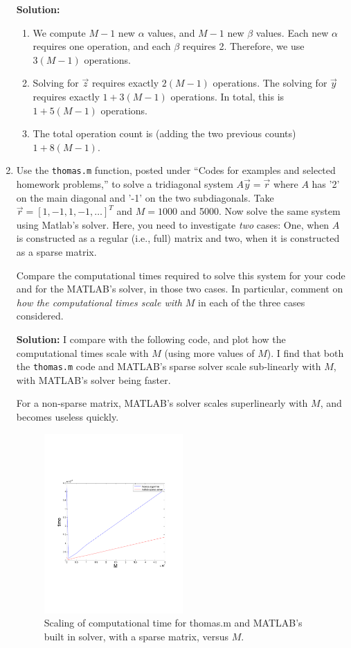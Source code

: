 \documentclass[11pt]{article}
\begin{document}
\begin{enumerate}
\bigskip
\textbf{Solution:} 
\begin{enumerate}
\item We compute $M-1$ new $\alpha$ values, and $M-1$ new $\beta$ values.
Each new $\alpha$ requires one operation, and each $\beta$ requires 2.
Therefore, we use $3(M-1)$ operations.
\item Solving for $\vec{z}$ requires exactly $2(M-1)$ operations.
The solving for $\vec{y}$ requires exactly $1+3(M-1)$ operations.
In total, this is $1+5(M-1)$ operations.
\item The total operation count is (adding the two previous counts) $1+8(M-1)$.
\end{enumerate}

\item Use the \verb|thomas.m| function, posted under ``Codes for examples and selected homework problems,'' to solve a tridiagonal system $A\vec{y} = \vec{r}$ where $A$ has '2' on the main diagonal and '-1' on the two subdiagonals.
Take $\vec{r} = [1,-1,1,-1,\ldots]^T$ and $M = 1000$ and 5000.
Now solve the same system using Matlab's solver.
Here, you need to investigate {\em two} cases: One, when $A$ is constructed as a regular (i.e., full) matrix and two, when it is constructed as a sparse matrix.

Compare the computational times required to solve this system for your code and for the MATLAB's solver, in those two cases.
In particular, comment on {\em how the computational times scale with $M$} in each of the three cases considered.

\bigskip
\textbf{Solution:} I compare with the following code, and plot how the computational times scale with $M$ (using more values of $M$).
I find that both the \verb|thomas.m| code and MATLAB's sparse solver scale sub-linearly with $M$, with MATLAB's solver being faster.

For a non-sparse matrix, MATLAB's solver scales superlinearly with $M$, and becomes useless quickly.



\begin{figure}[h!]
  \centering
    \includegraphics[width=0.5\textwidth]{andy_hw08_prb04_01.pdf}
  \caption{Scaling of computational time for thomas.m and MATLAB's built in solver, with a sparse matrix, versus $M$.}
\end{figure}


\end{enumerate}
\end{document}
